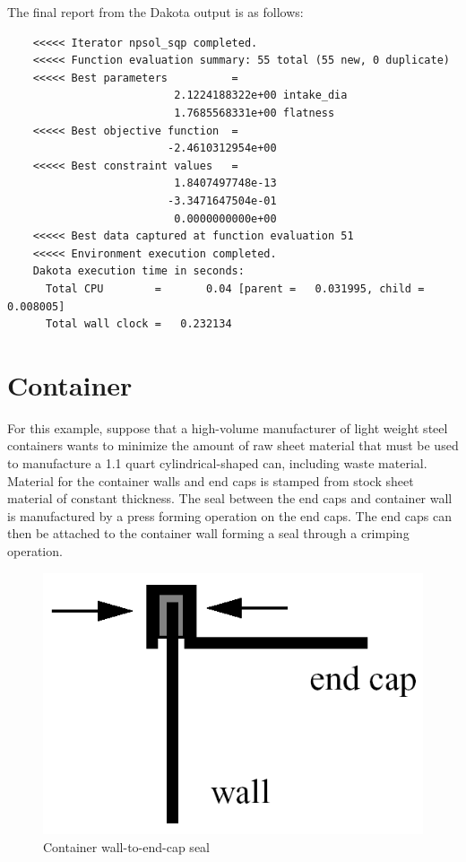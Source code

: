 The final report from the Dakota output is as follows:
\begin{small}
\begin{verbatim}
    <<<<< Iterator npsol_sqp completed.
    <<<<< Function evaluation summary: 55 total (55 new, 0 duplicate)
    <<<<< Best parameters          =
                          2.1224188322e+00 intake_dia
                          1.7685568331e+00 flatness
    <<<<< Best objective function  =
                         -2.4610312954e+00
    <<<<< Best constraint values   =
                          1.8407497748e-13
                         -3.3471647504e-01
                          0.0000000000e+00
    <<<<< Best data captured at function evaluation 51
    <<<<< Environment execution completed.
    Dakota execution time in seconds:
      Total CPU        =       0.04 [parent =   0.031995, child =   0.008005]
      Total wall clock =   0.232134
\end{verbatim}
\end{small}

\clearpage
\section{Container}\label{additional:container}

For this example, suppose that a high-volume manufacturer of light
weight steel containers wants to minimize the amount of raw sheet
material that must be used to manufacture a 1.1 quart
cylindrical-shaped can, including waste material. Material for the
container walls and end caps is stamped from stock sheet material of
constant thickness. The seal between the end caps and container wall
is manufactured by a press forming operation on the end caps. The end
caps can then be attached to the container wall forming a seal through
a crimping operation.

\begin{figure}[hb]
  \centering
  \includegraphics[scale=0.4]{images/end_cap}
  \caption{Container wall-to-end-cap seal}
  \label{additional:figure01}
\end{figure}


